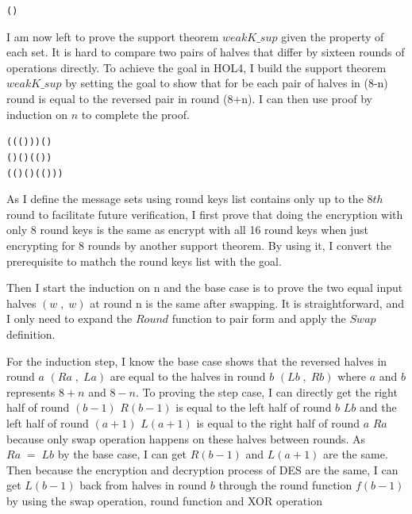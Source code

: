 \documentclass{article}
\begin{document}
\begin{alltt}
   \HOLTokenTurnstile{}  ( ) \HOLSymConst{=} 
\end{alltt}

I am now left to prove the support theorem $weakK\_sup$ given the property of each set. It is hard to compare two pairs of
halves that differ by sixteen rounds of operations directly. To achieve the goal in HOL4, I build the support theorem
$weakK\_sup$ by setting the goal to show that for be each pair of halves in (8-n) round is equal to the reversed pair
in round (8+n). I can then use proof by induction on $n$ to complete the proof.

\begin{alltt}
   \HOLTokenTurnstile{}    \HOLSymConst{\HOLTokenConj{}}  \HOLSymConst{\HOLTokenLeq{}}  \HOLSymConst{\HOLTokenConj{}}  \HOLSymConst{\HOLTokenLeq{}}  \HOLSymConst{\HOLTokenConj{}}
    ( (  (  ) )) \HOLSymConst{=} (\HOLSymConst{,}) \HOLSymConst{\HOLTokenImp{}}
    ( \HOLSymConst{\ensuremath{-}} ) (  ) ( ( )) \HOLSymConst{=}
    ( ( \HOLSymConst{\ensuremath{+}} ) (  ) ( ( )))
\end{alltt}

As I define the message sets using round keys list contains only up to the $8th$ round to facilitate future verification,
I first prove that doing the encryption with only 8 round keys is the same as encrypt with all 16 round keys
when just encrypting for 8 rounds by another support theorem. By using it, I convert the prerequisite to mathch the
round keys list with the goal.

Then I start the induction on n and the base case is to prove the two equal input halves $(w\;,\;w)$ at round n is the same after
swapping. It is straightforward, and I only need to expand the $Round$ function to pair form and apply the $Swap$ definition.

For the induction step, I know the base case shows that the reversed halves in round $a$ $(Ra\;,\; La)$ are equal to
the halves in round $b$ $(Lb\;,\;Rb)$ where $a$ and $b$ represents $8+n$ and $8-n$.
To proving the step case, I can directly get the right half of round $(b-1)$ $R(b-1)$ is equal to the left half of round $b$
$Lb$ and
the left half of round $(a+1)$ $L(a+1)$ is equal to the right half of round $a$ $Ra$ because only swap operation happens on
these halves between rounds. As $Ra\;= \; Lb$ by the base case, I can get $R(b-1)$ and $L(a+1)$ are the same.
Then because the encryption and decryption process of DES are the same, I can get $L(b-1)$ back from halves in round $b$ through
the round function $f(b-1)$ by using the swap operation, round function and XOR operation
\end{document}
